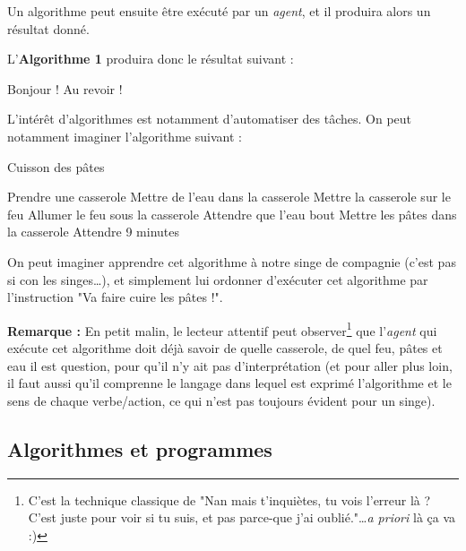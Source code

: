 \documentclass[../../main.tex]{subfiles}
\begin{document}
Un algorithme peut ensuite être exécuté par un \textit{agent}, et il produira alors un résultat donné.


L'\textbf{Algorithme 1} produira donc le résultat suivant :

\begin{minipage}{1.\textwidth} \selectfont
	Bonjour !\newline
	Au revoir !
\end{minipage}

L'intérêt d'algorithmes est notamment d'automatiser des tâches. On peut notamment imaginer l'algorithme suivant :
\newline
\begin{algorithm}
\caption{Cuisson des pâtes}\label{alg:letters}
Prendre une casserole\;
Mettre de l'eau dans la casserole\;
Mettre la casserole sur le feu\;
Allumer le feu sous la casserole\;
 {
	Attendre que l'eau bout\;
}
Mettre les pâtes dans la casserole\;
Attendre 9 minutes\;
\end{algorithm}

On peut imaginer apprendre cet algorithme à notre singe de compagnie (c'est pas si con les singes\dots), et simplement lui ordonner d'exécuter cet algorithme par l'instruction "Va faire cuire les pâtes !".

\textbf{Remarque :} En petit malin, le lecteur attentif peut observer\footnote{C'est la technique classique de "Nan mais t'inquiètes, tu vois l'erreur là ? C'est juste pour voir si tu suis, et pas parce-que j'ai oublié."\dots \textit{a priori} là ça va :)} que l'\textit{agent} qui exécute cet algorithme doit déjà savoir de quelle casserole, de quel feu, pâtes et eau il est question, pour qu'il n'y ait pas d'interprétation (et pour aller plus loin, il faut aussi qu'il comprenne le langage dans lequel est exprimé l'algorithme et le sens de chaque verbe/action, ce qui n'est pas toujours évident pour un singe).
\subsection{Algorithmes et programmes} \label{sub:algorithmes_et_programmes}
\end{document}
